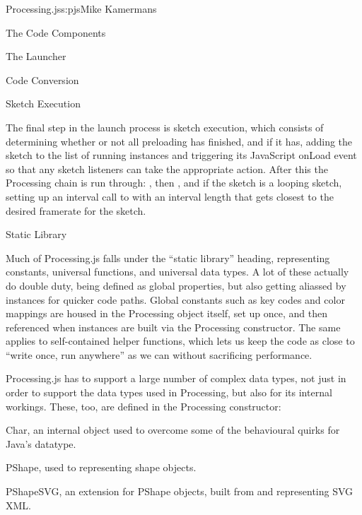 \begin{aosachapter}{Processing.js}{s:pjs}{Mike Kamermans}
\begin{aosasect1}{The Code Components}
\begin{aosasect2}{The Launcher}
\begin{aosasect3}{Code Conversion}
\end{aosasect3}

\begin{aosasect3}{Sketch Execution}

The final step in the launch process is sketch execution, which
consists of determining whether or not all preloading has finished,
and if it has, adding the sketch to the list of running instances
and triggering its JavaScript onLoad event so that any sketch
listeners can take the appropriate action. After this the Processing
chain is run through: , then , and if the
sketch is a looping sketch, setting up an interval call to 
with an interval length that gets closest to the desired framerate for
the sketch.

\end{aosasect3}

\end{aosasect2}

\begin{aosasect2}{Static Library}

Much of Processing.js falls under the ``static library'' heading,
representing constants, universal functions, and universal data
types. A lot of these actually do double duty, being defined as global
properties, but also getting aliassed by instances for quicker code
paths. Global constants such as key codes and color mappings are
housed in the Processing object itself, set up once, and then
referenced when instances are built via the Processing
constructor. The same applies to self-contained helper functions,
which lets us keep the code as close to ``write once, run anywhere'' as
we can without sacrificing performance.

Processing.js has to support a large number of complex data types, not
just in order to support the data types used in Processing, but also
for its internal workings. These, too, are defined in the Processing
constructor:

\begin{aosaitemize}

\item Char, an internal object used to overcome some of the
  behavioural quirks for Java's  datatype.

\item PShape, used to representing shape objects.

\item PShapeSVG, an extension for PShape objects, built from and
  representing SVG XML.


\end{aosaitemize}
\end{aosasect2}
\end{aosasect1}
\end{aosachapter}
